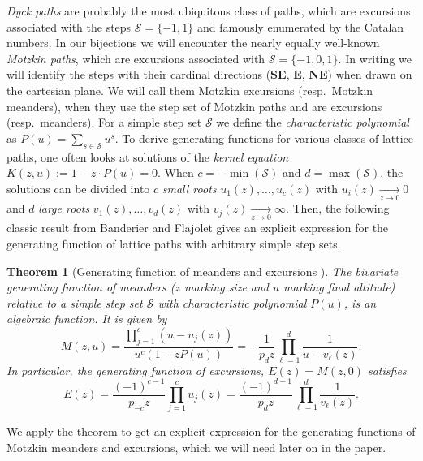 \documentclass{article}
\newtheorem{theorem}{Theorem}
\theoremstyle{definition}
\newcommand{\Sc}{\mathcal{S}}
\begin{document}
\emph{Dyck paths} are probably the most ubiquitous class of paths, which are excursions associated with the steps $\Sc = \{-1,1\}$ and famously enumerated by the Catalan numbers.
In our bijections we will encounter the nearly equally well-known \emph{Motzkin paths}, which are excursions associated with $\Sc = \{-1,0,1\}$. In writing we will identify the steps with their cardinal directions (\textbf{SE}, \textbf{E}, \textbf{NE}) when drawn on the cartesian plane.
We will call them Motzkin excursions (resp.\ Motzkin meanders), when they use the step set of Motzkin paths and are excursions (resp.\ meanders).
For a simple step set $\mathcal{S}$ we define the \textit{characteristic polynomial} as $P(u) = \sum_{s \in \mathcal{S}} u^s$.
To derive generating functions for various classes of lattice paths, one often looks at solutions of the \textit{kernel equation} $K(z,u) := 1 - z \cdot P(u) = 0$. When $c = - \min(\mathcal{S})$ and $d = \max(\mathcal{S})$, the solutions can be divided into $c$ \textit{small roots} $u_1(z), \dots, u_c(z)$ with $u_i(z) \xrightarrow[z \to 0]{} 0$ and $d$ \textit{large roots} $v_1(z), \dots, v_d(z)$ with $v_j(z) \xrightarrow[z \to 0]{} \infty$.
Then, the following classic result from Banderier and Flajolet gives an explicit expression for the generating function of lattice paths with arbitrary simple step sets.

\begin{theorem}[Generating function of meanders and excursions {\cite[Theorem 2]{BasicLatticePaths}}]
\label{thm:gf_meanders_excursions}
  The bivariate generating function of meanders ($z$ marking size and $u$ marking final altitude) relative to a simple step set $\mathcal{S}$ with characteristic polynomial $P(u)$, is an algebraic function. It is given by
  \begin{equation} \label{eq:gf_meanders}
    M(z,u) = \frac{\prod_{j=1}^c (u - u_j(z))}{u^c(1-zP(u))} = -\frac{1}{p_dz} \prod_{\ell = 1}^d \frac{1}{u - v_\ell(z)}.
  \end{equation}
  In particular, the generating function of excursions, $E(z) = M(z,0)$ satisfies
  \begin{equation} \label{eq:gf_excursions}
    E(z) = \frac{(-1)^{c-1}}{p_{-c}z}
    \prod_{j=1}^c u_j(z) = \frac{(-1)^{d-1}}{p_dz} \prod_{\ell=1}^d \frac{1}{v_\ell(z)}.
  \end{equation}
\end{theorem}

We apply the theorem to get an explicit expression for the generating functions of Motzkin meanders and excursions, which we will need later on in the paper.
\end{document}

